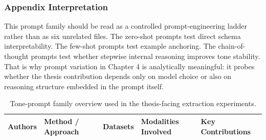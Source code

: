 \documentclass[english, online, cse, master]{dithesis}
\begin{document}
\subsubsection{Appendix Interpretation}\label{appendix-interpretation}

This prompt family should be read as a controlled prompt-engineering ladder rather than as six unrelated files. The zero-shot prompts test direct schema interpretability. The few-shot prompts test example anchoring. The chain-of-thought prompts test whether stepwise internal reasoning improves tone stability. That is why prompt variation in Chapter 4 is analytically meaningful: it probes whether the thesis contribution depends only on model choice or also on reasoning structure embedded in the prompt itself.

\begin{landscape}
\begin{table}[p]
\centering
\caption{Tone-prompt family overview used in the thesis-facing extraction experiments.}
\label{tab:tone-prompt-family-overview}
\small
\renewcommand{\arraystretch}{1.2}
\begin{tabularx}{\linewidth}{|X|p{2.5cm}|X|X|X|}
\hline
Authors & Method / Approach & Datasets & Modalities Involved & Key Contributions \\ \hline


\end{tabularx}
\end{table}
\end{landscape}
\end{document}

